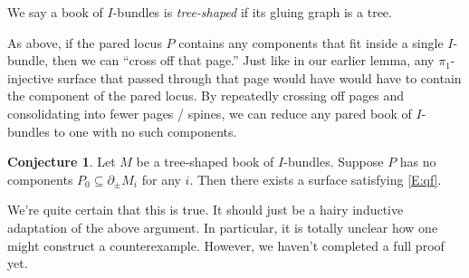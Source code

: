 \documentclass[12pt]{amsart}
\theoremstyle{definition}
\newtheorem{conj}[theorem]{Conjecture}
\theoremstyle{remark}
\newcommand{\bd}{\partial}
\newcommand{\cin}{\subseteq}
\begin{document}
We say a book of $I$-bundles is \emph{tree-shaped} if its gluing graph is
a tree.

As above, if the pared locus $P$ contains any components that fit inside
a single $I$-bundle, then we can ``cross off that page.'' Just like in our
earlier lemma, any $\pi_1$-injective surface that passed through that page
would have would have to contain the component of the pared locus. By
repeatedly crossing off pages and consolidating into fewer pages / spines, we
can reduce any pared book of $I$-bundles to one with no such components.

\begin{conj}

Let $M$ be a tree-shaped book of $I$-bundles. Suppose $P$ has no components
$P_0\cin \bd_\pm M_i$ for any $i$. Then there exists a surface satisfying
\eqref{E:qf}.

\end{conj}

We're quite certain that this is true. It should just be a hairy inductive
adaptation of the above argument. In particular, it is totally unclear how one
might construct a counterexample. However, we haven't completed a full proof
yet.
\end{document}
